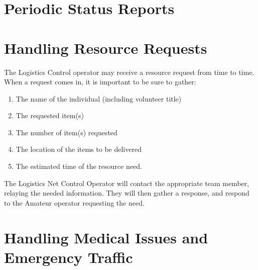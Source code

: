 \documentclass[pdflatex,letterpaper,twoside,12pt]{book}
\begin{document}

\section{Periodic Status Reports}


\section{Handling Resource Requests}

The Logistics Control operator may receive a resource request from time to time. When a request comes in, it is important to be sure to gather:

\begin{enumerate}
\item The name of the individual (including volunteer title)
\item The requested item(s)
\item The number of item(s) requested
\item The location of the items to be delivered
\item The estimated time of the resource need.
\end{enumerate}

The Logistics Net Control Operator will contact the appropriate team member, relaying the needed information. They will then gather a response, and respond to the Amateur operator requesting the need.


\section{Handling Medical Issues and Emergency Traffic}

\iffalse %
We want to change emergencies.. No longer will we hold traffic for nets. We need 
to get back to the "Break Break" for emergency traffic, which then we hold only 
for the traffic, not until the ER is rectified. We need to work  HARD on getting 
Medical onto their own freq. and allowing logistics to handle the ER Dispatch, 
etc. We will be having a meeting in January with Leisha and Dave Polaski in 
regards. Wold like you to be there also. More to come here as we get closer, but 
Were taking control and selling the idea direct to Dave to get his buy in and 
push on Dennis. no more Dennis pushing us around. They need to do their job too!
\fi %
\end{document}
